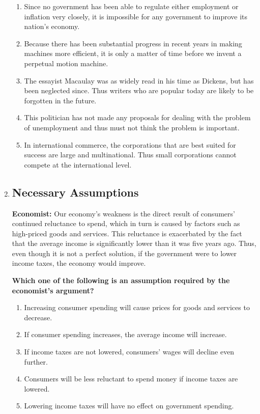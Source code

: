 \documentclass[9pt]{article}
\begin{document}
\begin{multicols}{3}
\begin{enumerate}
\begin{enumerate}[label=(\alph*)]
    \item Since no government has been able to regulate either employment or inflation very closely, it is impossible for any government to improve its nation's economy.
    \item Because there has been substantial progress in recent years in making machines more efficient, it is only a matter of time before we invent a perpetual motion machine.
    \item The essayist Macaulay was as widely read in his time as Dickens, but has been neglected since. Thus writers who are popular today are likely to be forgotten in the future.
    \item This politician has not made any proposals for dealing with the problem of unemployment and thus must not think the problem is important.
    \item In international commerce, the corporations that are best suited for success are large and multinational. Thus small corporations cannot compete at the international level.
\end{enumerate}


\item 
\subsection*{Necessary Assumptions}

\noindent
\textbf{Economist:} Our economy's weakness is the direct result of consumers' continued reluctance to spend, which in turn is caused by factors such as high-priced goods and services. This reluctance is exacerbated by the fact that the average income is significantly lower than it was five years ago. Thus, even though it is not a perfect solution, if the government were to lower income taxes, the economy would improve.

 

\noindent
\textbf{Which one of the following is an assumption required by the economist’s argument?}

\begin{enumerate}[label=(\alph*)]
    \item Increasing consumer spending will cause prices for goods and services to decrease.
    \item If consumer spending increases, the average income will increase.
    \item If income taxes are not lowered, consumers' wages will decline even further.
    \item Consumers will be less reluctant to spend money if income taxes are lowered.
    \item Lowering income taxes will have no effect on government spending.
\end{enumerate}


\end{enumerate}
\end{multicols}
\end{document}
